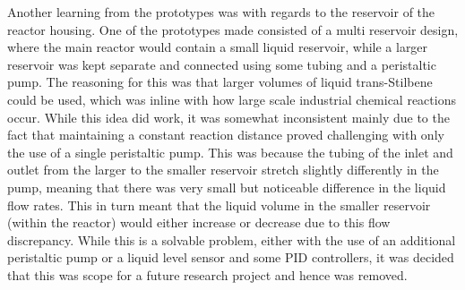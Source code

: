 Another learning from the prototypes was with regards to the reservoir of the reactor housing. One of the prototypes made consisted of a multi reservoir design, where the main reactor would contain a small liquid reservoir, while a larger reservoir was kept separate and connected using some tubing and a peristaltic pump. The reasoning for this was that larger volumes of liquid trans-Stilbene could be used, which was inline with how large scale industrial chemical reactions occur. While this idea did work, it was somewhat inconsistent mainly due to the fact that maintaining a constant reaction distance proved challenging with only the use of a single peristaltic pump. This was because the tubing of the inlet and outlet from the larger to the smaller reservoir stretch slightly differently in the pump, meaning that there was very small but noticeable difference in the liquid flow rates. This in turn meant that the liquid volume in the smaller reservoir (within the reactor) would either increase or decrease due to this flow discrepancy. While this is a solvable problem, either with the use of an additional peristaltic pump or a liquid level sensor and some PID controllers, it was decided that this was scope for a future research project and hence was removed. 



